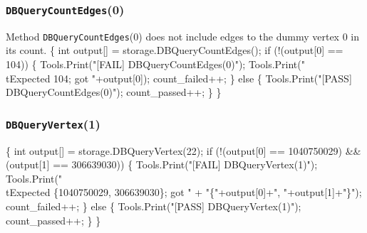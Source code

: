 \documentclass{article}
\def\nwendcode{\endtrivlist \endgroup}
\let\nwdocspar=\par
\begin{document}
\subsubsection{{\tt{}DBQueryCountEdges}(0)}
Method {\tt{}DBQueryCountEdges}(0) does not include edges to the dummy vertex 0 in
its count.
\nwenddocs{}\endmoddef{}
\{
  int output[] = storage.DBQueryCountEdges();
  if (!(output[0] == 104)) \{
    Tools.Print("[FAIL] DBQueryCountEdges(0)");
    Tools.Print("\\tExpected 104; got "+output[0]);
    count_failed++;
  \} else \{
    Tools.Print("[PASS] DBQueryCountEdges(0)");
    count_passed++;
  \}
\}
\nwendcode{}\nwdocspar
\subsubsection{{\tt{}DBQueryVertex}(1)}
\nwenddocs{}\endmoddef{}
\{
  int output[] = storage.DBQueryVertex(22);
  if (!(output[0] == 1040750029)
    && (output[1] == 306639030)) \{
    Tools.Print("[FAIL] DBQueryVertex(1)");
    Tools.Print("\\tExpected \{1040750029, 306639030\}; got "
      + "\{"+output[0]+", "+output[1]+"\}");
    count_failed++;
  \} else \{
    Tools.Print("[PASS] DBQueryVertex(1)");
    count_passed++;
  \}
\}
\nwendcode{}\nwdocspar
\end{document}
